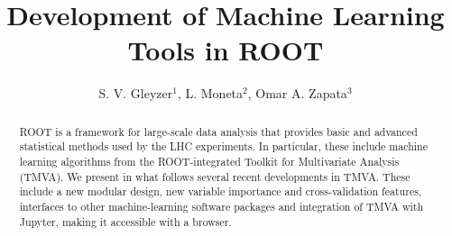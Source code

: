 \documentclass[a4paper]{jpconf}
\begin{document}
\title{Development of Machine Learning Tools in ROOT}
\author{S. V. Gleyzer$^1$, L. Moneta$^2$, Omar A. Zapata$^3$ }

\address{$^1$ University of Florida}
\address{$^2$ CERN}
\address{$^3$ University of Antioquia and Metropolitan Institute of Technology}





\begin{abstract}
ROOT is a framework for large-scale data analysis that provides basic and advanced statistical methods used by the LHC experiments. In particular, these include machine learning algorithms from the ROOT-integrated Toolkit for Multivariate Analysis (TMVA). We present in what follows several recent developments in TMVA. These include a new modular design, new variable importance and cross-validation features, interfaces to other machine-learning software packages and integration of TMVA with Jupyter, making it accessible with a browser.
\end{abstract}
\end{document}
